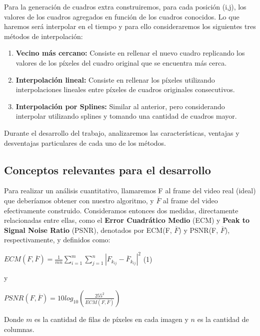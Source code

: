 Para la generaci\'on de cuadros extra construiremos, para cada posici\'on (i,j), los valores de los cuadros agregados en funci\'on de los cuadros conocidos. Lo que haremos ser\'a interpolar en el tiempo y para ello consideraremos los siguientes tres m\'etodos de interpolaci\'on:

\begin{enumerate}
\item \textbf{Vecino m\'as cercano:} Consiste en rellenar el nuevo cuadro replicando los valores de los p\'ixeles del cuadro original que se encuentra m\'as cerca.
\item \textbf{Interpolaci\'on lineal:} Consiste en rellenar los p\'ixeles utilizando interpolaciones lineales entre p\'ixeles de cuadros originales consecutivos.
\item \textbf{Interpolaci\'on por Splines:} Similar al anterior, pero considerando interpolar utilizando splines y tomando una cantidad de cuadros mayor.
\end{enumerate}

Durante el desarrollo del trabajo, analizaremos las caracter\'isticas, ventajas y desventajas particulares de cada uno de los m\'etodos. 

\subsection{Conceptos relevantes para el desarrollo}

Para realizar un an\'alisis cuantitativo, llamaremos F al frame del video real (ideal) que deber\'iamos obtener con nuestro algoritmo, y $\overline{F}$ al frame del video efectivamente construido. Consideramos entonces dos medidas, directamente relacionadas entre ellas, como el \textbf{Error Cuadr\'atico Medio} (ECM) y \textbf{Peak to Signal Noise Ratio} (PSNR), denotados por ECM(F, $\overline{F}$) y PSNR(F, $\overline{F}$), respectivamente, y definidos como:

$ECM(F, \overline{F}) = \frac{1}{mn} \sum\limits_{i=1}^m\sum\limits_{j=1}^n |F_{k_{ij}} - \overline{F}_{k_{ij}}|^2$ (1)

y

$PSNR(F, \overline{F}) = 10log_{10}(\frac{255^2}{ECM(F,\overline{F})})$

Donde $m$ es la cantidad de filas de p\'ixeles en cada imagen y $n$ es la cantidad de columnas.